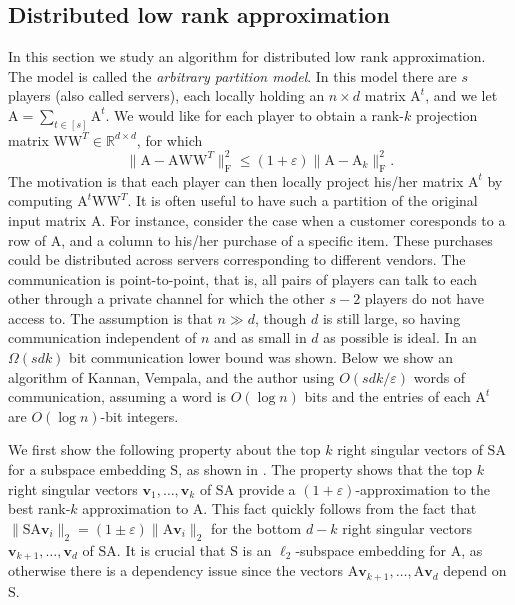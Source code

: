 \documentclass[11pt]{article}
\newcommand{\FNormS}[1]{\mbox{}\|#1\|_\mathrm{F}^2}
\newcommand{\mat}[1]{{\ensuremath{\bm{\mathrm{#1}}}}}
\def\ve{{\mathbf v}}
\def\matA{\mat{A}}
\def\matS{\mat{S}}
\def\matW{\mat{W}}
\newcommand{\eps}{\varepsilon}
\begin{document}
\subsection{Distributed low rank approximation}\label{sec:dislra}
In this section we study an algorithm for distributed low rank approximation. The model is called the 
{\it arbitrary partition model}. In this model there are $s$ players (also called servers), 
each locally holding an $n \times d$ 
matrix $\matA^t$, and we let $\matA = \sum_{t \in [s]} \matA^t$. We would like for each player to obtain a rank-$k$ projection
matrix $\matW\matW^T \in \mathbb{R}^{d \times d}$, for which 
$$\FNormS{\matA-\matA\matW\matW^T} \leq (1+\eps)\FNormS{\matA-\matA_k}.$$
The motivation is that each player can then locally project his/her matrix $\matA^t$ by computing 
$\matA^t\matW\matW^T$. It is often useful to have such a partition of the original input matrix $\matA$. For instance,
consider the case when a customer coresponds to a row of $\matA$, and a column to his/her purchase of a specific item. 
These purchases could be distributed across servers corresponding to different vendors. The communication is point-to-point,
that is, all pairs of players can talk to each other through a private channel for which the other $s-2$ players do not
have access to. The assumption is that $n \gg d$, though $d$ is still large, so having communication independent of $n$
and as small in $d$ as possible is ideal. In \cite{kvw14} an $\Omega(sdk)$ bit communication lower bound was shown. 
Below we show an algorithm of Kannan, Vempala, and the author \cite{kvw14} using $O(sdk/\eps)$ words of communication, 
assuming a word is $O(\log n)$ bits and the entries of each $\matA^t$ are $O(\log n)$-bit integers. 

We first show the following property about the top $k$ right 
singular vectors of $\matS\matA$ for a subspace
embedding $\matS$, as shown in \cite{kvw14}. The property shows that 
the top $k$ right singular
vectors $\ve_1, \ldots, \ve_k$ of $\matS \matA$ provide a 
$(1+\eps)$-approximation to the best rank-$k$ approximation
to $\matA$. This fact quickly follows from the fact that 
$\|\matS \matA \ve_i\|_2 = (1 \pm \eps)\|\matA \ve_i\|_2$ for the bottom $d-k$ right singular vectors
$\ve_{k+1}, \ldots, \ve_{d}$ of $\matS \matA$. It is crucial that $\matS$ is an $\ell_2$-subspace
embedding for $\matA$, as otherwise there is a dependency issue since 
the vectors $\matA\ve_{k+1}, \ldots, \matA\ve_d$ depend on $\matS$. 
\end{document}
